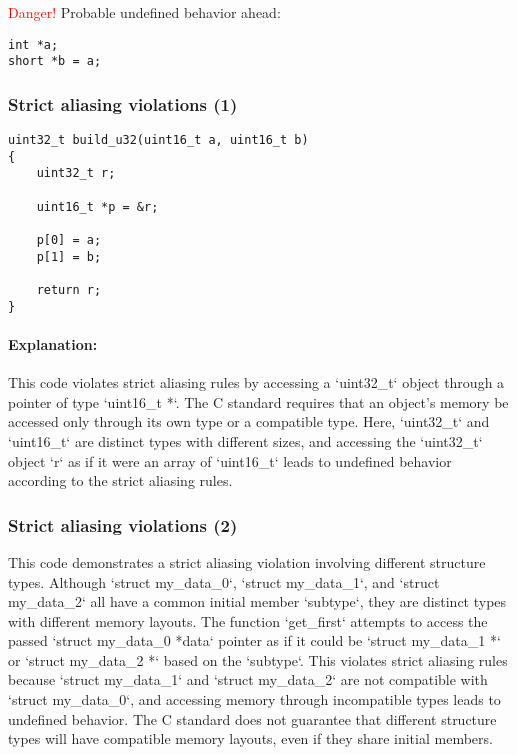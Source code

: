 \documentclass[12pt]{article}
\begin{document}
\textcolor{red}{Danger!} Probable undefined behavior ahead:

\begin{verbatim}
int *a;
short *b = a;
\end{verbatim}
\subsubsection{Strict aliasing violations (1)}

\begin{verbatim}
uint32_t build_u32(uint16_t a, uint16_t b)
{
    uint32_t r;

    uint16_t *p = &r;

    p[0] = a;
    p[1] = b;

    return r;
}
\end{verbatim}

\paragraph{Explanation:}
This code violates strict aliasing rules by accessing a `uint32\_t` object through a pointer of type `uint16\_t *`. The C standard requires that an object's memory be accessed only through its own type or a compatible type. Here, `uint32\_t` and `uint16\_t` are distinct types with different sizes, and accessing the `uint32\_t` object `r` as if it were an array of `uint16\_t` leads to undefined behavior according to the strict aliasing rules.



\subsubsection{Strict aliasing violations (2)}

This code demonstrates a strict aliasing violation involving different structure types. Although `struct my\_data\_0`, `struct my\_data\_1`, and `struct my\_data\_2` all have a common initial member `subtype`, they are distinct types with different memory layouts. The function `get\_first` attempts to access the passed `struct my\_data\_0 *data` pointer as if it could be `struct my\_data\_1 *` or `struct my\_data\_2 *` based on the `subtype`. This violates strict aliasing rules because `struct my\_data\_1` and `struct my\_data\_2` are not compatible with `struct my\_data\_0`, and accessing memory through incompatible types leads to undefined behavior. The C standard does not guarantee that different structure types will have compatible memory layouts, even if they share initial members.
\end{document}
